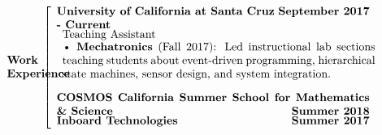 \documentclass[paper=a4,fontsize=11pt]{article} %
\def \mainColWidth {0.8\textwidth}		%
\def \leftColWidth {0.05\textwidth}		%
\begin{document}
\begin{align*}
	&\\
	&
	\begin{array}{l} 
	\parbox{\leftColWidth}{%
		\textbf{Work \\ Experience}
	}%
	\end{array}
	&
	\left[\begin{array}{l}
		\parbox{\mainColWidth}{%
			\textbf{University of California at Santa Cruz} \hfill \textbf{September 2017 - Current}
		}%
		\\
		\begin{array}{l}
			\text{Teaching Assistant} \\
			\parbox{\mainColWidth}{%
				\textbullet\ \textbf{Mechatronics} (Fall 2017): Led instructional lab sections teaching students about event-driven programming, hierarchical state machines, sensor design, and system integration.
			}%
		\end{array}\\
		\\
		\parbox{\mainColWidth}{%
			\textbf{COSMOS California Summer School for Mathematics \& Science}  \hfill \textbf{Summer 2018}
		}%
		\\
		\parbox{\mainColWidth}{%
			\textbf{Inboard Technologies} \hfill \textbf{Summer 2017}
		}%
	\end{array}\right. \\
\end{align*}
\end{document}
